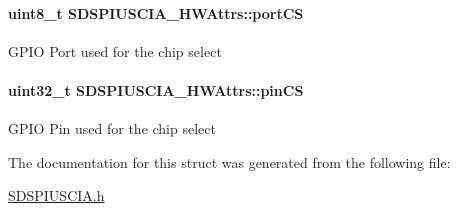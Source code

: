 \paragraph[{port\-C\-S}]{\setlength{\rightskip}{0pt plus 5cm}uint8\-\_\-t S\-D\-S\-P\-I\-U\-S\-C\-I\-A\-\_\-\-H\-W\-Attrs\-::port\-C\-S}\label{struct_s_d_s_p_i_u_s_c_i_a___h_w_attrs_aa10da6b5705fa5bdb6087a7f44374ea1}
G\-P\-I\-O Port used for the chip select 
\paragraph[{pin\-C\-S}]{\setlength{\rightskip}{0pt plus 5cm}uint32\-\_\-t S\-D\-S\-P\-I\-U\-S\-C\-I\-A\-\_\-\-H\-W\-Attrs\-::pin\-C\-S}\label{struct_s_d_s_p_i_u_s_c_i_a___h_w_attrs_a5d7132ccc67a85fa26e3c1af856410c4}
G\-P\-I\-O Pin used for the chip select 

The documentation for this struct was generated from the following file\-:\begin{DoxyCompactItemize}
\item 
\hyperlink{_s_d_s_p_i_u_s_c_i_a_8h}{S\-D\-S\-P\-I\-U\-S\-C\-I\-A.\-h}\end{DoxyCompactItemize}
